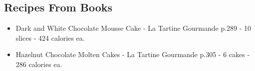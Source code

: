 \subsection*{Recipes From Books}
\begin{itemize}
    \item Dark and White Chocolate Mousse Cake - La Tartine Gourmande p.289 - 10 slices - 424 calories ea.
    \item Hazelnut Chocolate Molten Cakes - La Tartine Gourmande p.305 - 6 cakes - 286 calories ea.
\end{itemize}